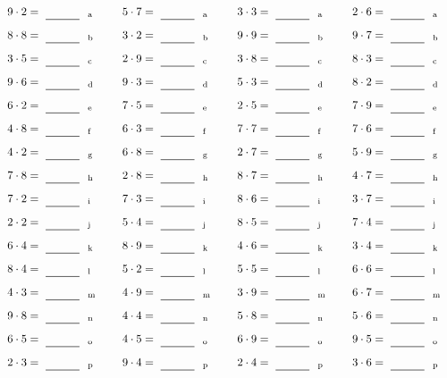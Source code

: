\documentclass
[
  draft    = true,
  fontsize = 11pt,
  parskip  = half-
]
{scrartcl}
\begin{document}
\par\vfill\par
\begin{align*}
    \pline{9\cdot2}&=\rline{a}
  & \pline{5\cdot7}&=\rline{a}
  & \pline{3\cdot3}&=\rline{a}
  & \pline{2\cdot6}&=\rline{a} \\[1ex]
    \pline{8\cdot8}&=\rline{b}
  & \pline{3\cdot2}&=\rline{b}
  & \pline{9\cdot9}&=\rline{b}
  & \pline{9\cdot7}&=\rline{b} \\[1ex]
    \pline{3\cdot5}&=\rline{c}
  & \pline{2\cdot9}&=\rline{c}
  & \pline{3\cdot8}&=\rline{c}
  & \pline{8\cdot3}&=\rline{c} \\[1ex]
    \pline{9\cdot6}&=\rline{d}
  & \pline{9\cdot3}&=\rline{d}
  & \pline{5\cdot3}&=\rline{d}
  & \pline{8\cdot2}&=\rline{d} \\[1ex]
    \pline{6\cdot2}&=\rline{e}
  & \pline{7\cdot5}&=\rline{e}
  & \pline{2\cdot5}&=\rline{e}
  & \pline{7\cdot9}&=\rline{e} \\[1ex]
    \pline{4\cdot8}&=\rline{f}
  & \pline{6\cdot3}&=\rline{f}
  & \pline{7\cdot7}&=\rline{f}
  & \pline{7\cdot6}&=\rline{f} \\[1ex]
    \pline{4\cdot2}&=\rline{g}
  & \pline{6\cdot8}&=\rline{g}
  & \pline{2\cdot7}&=\rline{g}
  & \pline{5\cdot9}&=\rline{g} \\[1ex]
    \pline{7\cdot8}&=\rline{h}
  & \pline{2\cdot8}&=\rline{h}
  & \pline{8\cdot7}&=\rline{h}
  & \pline{4\cdot7}&=\rline{h} \\[1ex]
    \pline{7\cdot2}&=\rline{i}
  & \pline{7\cdot3}&=\rline{i}
  & \pline{8\cdot6}&=\rline{i}
  & \pline{3\cdot7}&=\rline{i} \\[1ex]
    \pline{2\cdot2}&=\rline{j}
  & \pline{5\cdot4}&=\rline{j}
  & \pline{8\cdot5}&=\rline{j}
  & \pline{7\cdot4}&=\rline{j} \\[1ex]
    \pline{6\cdot4}&=\rline{k}
  & \pline{8\cdot9}&=\rline{k}
  & \pline{4\cdot6}&=\rline{k}
  & \pline{3\cdot4}&=\rline{k} \\[1ex]
    \pline{8\cdot4}&=\rline{l}
  & \pline{5\cdot2}&=\rline{l}
  & \pline{5\cdot5}&=\rline{l}
  & \pline{6\cdot6}&=\rline{l} \\[1ex]
    \pline{4\cdot3}&=\rline{m}
  & \pline{4\cdot9}&=\rline{m}
  & \pline{3\cdot9}&=\rline{m}
  & \pline{6\cdot7}&=\rline{m} \\[1ex]
    \pline{9\cdot8}&=\rline{n}
  & \pline{4\cdot4}&=\rline{n}
  & \pline{5\cdot8}&=\rline{n}
  & \pline{5\cdot6}&=\rline{n} \\[1ex]
    \pline{6\cdot5}&=\rline{o}
  & \pline{4\cdot5}&=\rline{o}
  & \pline{6\cdot9}&=\rline{o}
  & \pline{9\cdot5}&=\rline{o} \\[1ex]
    \pline{2\cdot3}&=\rline{p}
  & \pline{9\cdot4}&=\rline{p}
  & \pline{2\cdot4}&=\rline{p}
  & \pline{3\cdot6}&=\rline{p}
\end{align*}
\end{document}
